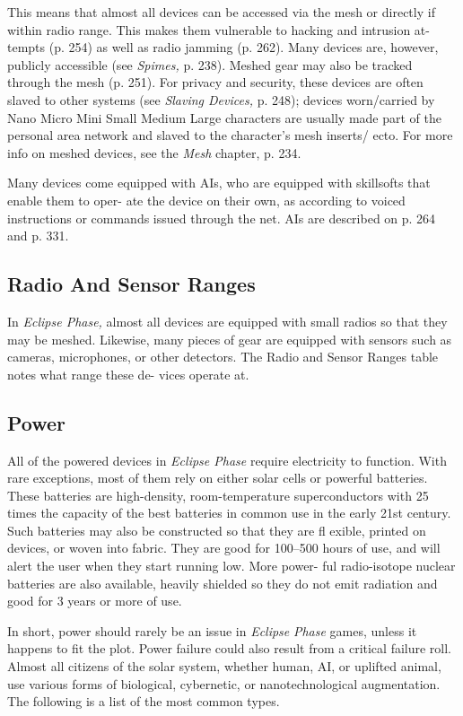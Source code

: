 This means that almost all devices can be accessed 
via the mesh or directly if within radio range. This 
makes them vulnerable to hacking and intrusion at-
tempts (p. 254) as well as radio jamming (p. 262). 
Many devices are, however, publicly accessible (see 
\textit{Spimes,} p. 238). Meshed gear may also be tracked 
through the mesh (p. 251). For privacy and security, 
these devices are often slaved to other systems (see 
\textit{Slaving Devices,} p. 248); devices worn/carried by 
Nano
Micro
Mini
Small
Medium
Large
characters are usually made part of the personal area 
network and slaved to the character's mesh inserts/
ecto. For more info on meshed devices, see the \textit{Mesh}
chapter, p. 234.

Many devices come equipped with AIs, who are 
equipped with skillsofts that enable them to oper-
ate the device on their own, as according to voiced 
instructions or commands issued through the net. AIs 
are described on p. 264 and p. 331.

\subsection{Radio And Sensor Ranges}

In \textit{Eclipse Phase,} almost all devices are equipped with 
small radios so that they may be meshed. Likewise, 
many pieces of gear are equipped with sensors such as 
cameras, microphones, or other detectors. The Radio 
and Sensor Ranges table notes what range these de-
vices operate at.

\subsection{Power}

All of the powered devices in \textit{Eclipse Phase} require 
electricity to function. With rare exceptions, most of 
them rely on either solar cells or powerful batteries. 
These batteries are high-density, room-temperature 
superconductors with 25 times the capacity of the 
best batteries in common use in the early 21st century. 
Such batteries may also be constructed so that they 
are fl exible, printed on devices, or woven into fabric. 
They are good for 100–500 hours of use, and will alert 
the user when they start running low. More power-
ful radio-isotope nuclear batteries are also available, 
heavily shielded so they do not emit radiation and 
good for 3 years or more of use.

In short, power should rarely be an issue in \textit{Eclipse }
\textit{Phase} games, unless it happens to fit the plot. Power 
failure could also result from a critical failure roll.
Almost all citizens of the solar system, whether human, 
AI, or uplifted animal, use various forms of biological, 
cybernetic, or nanotechnological augmentation. The 
following is a list of the most common types.

